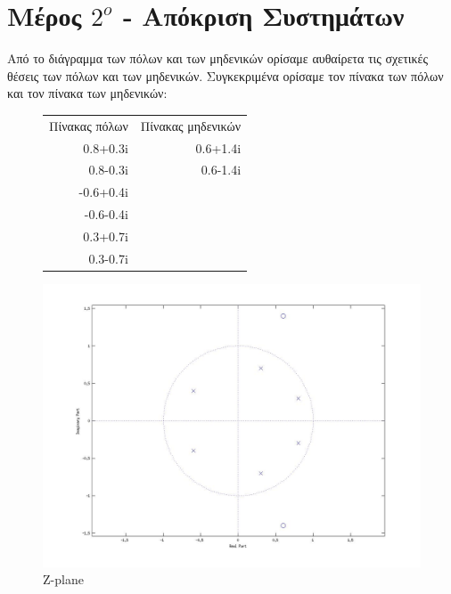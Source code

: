 \documentclass[a4paper,10pt]{article} \usepackage{anysize}
\begin{document}
\pagebreak
\section*{Μέρος $2^o$ - Απόκριση Συστημάτων}


Από το διάγραμμα των πόλων και των μηδενικών ορίσαμε αυθαίρετα τις σχετικές
θέσεις των πόλων και των μηδενικών. Συγκεκριμένα ορίσαμε τον πίνακα των πόλων
και τον πίνακα των μηδενικών:

\begin{figure}[H]
\begin{tabular}{r r}
Πίνακας πόλων & Πίνακας μηδενικών \\
0.8+0.3i &0.6+1.4i\\
0.8-0.3i &0.6-1.4i\\
-0.6+0.4i &\\
-0.6-0.4i &\\
0.3+0.7i &\\
0.3-0.7i &\\
\end{tabular}
\end{figure}
\begin{figure}[H]
\caption{Z-plane}
\centering
	\includegraphics[scale=0.4]{files/21-Z-PLANE.jpg}
\end{figure}
\end{document}

